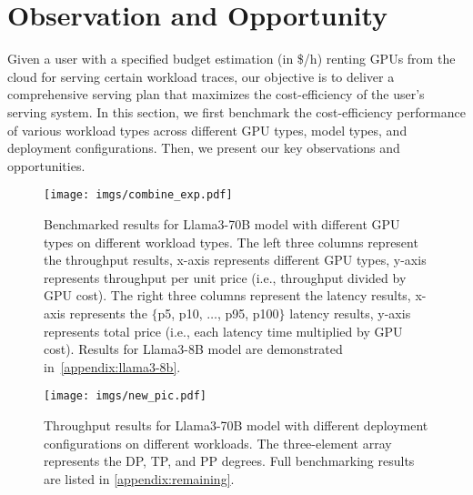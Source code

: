 \section{Observation and Opportunity}
\label{sec: motivation}

Given a user with a specified budget estimation (in \$/h) renting GPUs from the cloud for serving certain workload traces, our objective is to deliver a comprehensive serving plan that maximizes the cost-efficiency of the user's serving system.
In this section, we first benchmark the cost-efficiency performance of various workload types across different GPU types, model types, and deployment configurations. Then, we present our key observations and opportunities.

\begin{figure*}[t!]
    \centering
    \texttt{[image: imgs/combine\_exp.pdf]}
    \caption{\small{Benchmarked results for Llama3-70B model with different GPU types on different workload types. The left three columns represent the throughput results, x-axis represents different GPU types, y-axis represents throughput per unit price (i.e., throughput divided by GPU cost). The right three columns represent the latency results, x-axis represents the $\{$p5, p10, $\dots$, p95, p100$\}$ latency results, y-axis represents total price (i.e., each latency time multiplied by GPU cost). Results for Llama3-8B model are demonstrated in~\autoref{appendix:llama3-8b}.}}
    \label{fig:benchmark1}
    \vspace{-1em}
\end{figure*}


\begin{figure*}[!t]
    \centering
    \texttt{[image: imgs/new\_pic.pdf]}
    \caption{Throughput results for Llama3-70B model with different deployment configurations on different workloads. The three-element array represents the DP, TP, and PP degrees. Full benchmarking results are listed in \autoref{appendix:remaining}.}
    \label{fig:benchmark2}
    \label{fig:benchmark2.1}
    \vspace{-1em}
\end{figure*}


